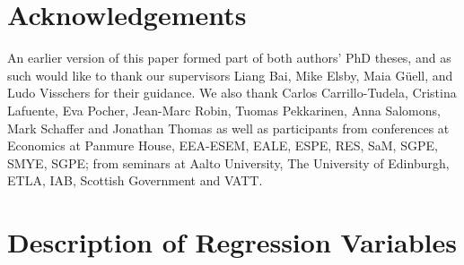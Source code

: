 \documentclass[12pt,authoryear]{elsarticle}
\begin{document}
	
	
	
	
	
	
	
	\newpage
	\section{Acknowledgements}
	
	An earlier version of this paper formed part of both authors' PhD theses, and as such would like to thank our supervisors Liang Bai, Mike Elsby, Maia G\"{u}ell, and Ludo Visschers for their guidance. We also thank Carlos Carrillo-Tudela, Cristina Lafuente, Eva Pocher, Jean-Marc Robin, Tuomas Pekkarinen, Anna Salomons, Mark Schaffer and Jonathan Thomas as well as participants from conferences at Economics at Panmure House, EEA-ESEM, EALE, ESPE, RES, SaM, SGPE, SMYE, SGPE; from seminars at Aalto University, The University of Edinburgh, ETLA,  IAB, Scottish Government and VATT. 
	\newpage
	\appendix
	\setcounter{table}{0}
	\section{Description of Regression Variables}
	\label{app:regVars}
	
\end{document}

